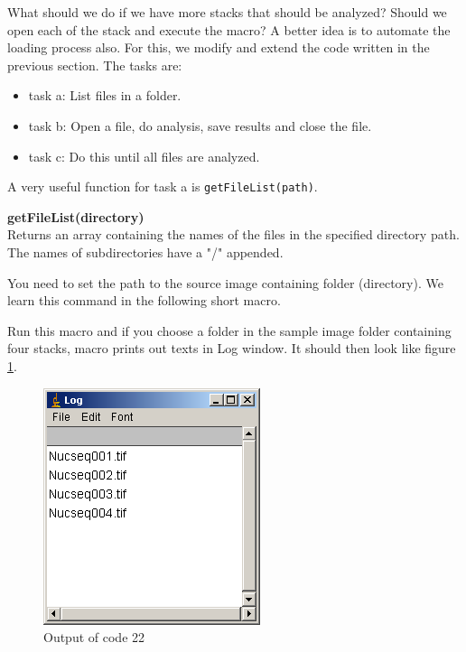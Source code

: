 \documentclass[11pt,a4paper,oneside]{report}
\newenvironment{indentCom}%
{\begin{list}{}%
         {\setlength{\leftmargin}{1em}}%
         \item[]%
}
{\end{list}}
\newcommand{\ilcom}[1]{\texttt{\small#1}}
\begin{document}
What should we do if we have more stacks that should be analyzed? Should we open each of the stack and execute the macro? A better idea is to automate the loading process also. For this, we modify and extend the code written in the previous section. The tasks are:

\begin{itemize}
\item task a: List files in a folder.
\item task b: Open a file, do analysis, save results and close the file. 
\item task c: Do this until all files are analyzed.
\end{itemize}
 
A very useful function for task a is \ilcom{getFileList(path)}.
\begin{indentCom}
\textbf{getFileList(directory)}\\
Returns an array containing the names of the files in the specified directory path. The names of subdirectories have a "/" appended.
\end{indentCom}
 
You need to set the path to the source image containing folder (directory). We learn this command in the following short macro. 



Run this macro and if you choose a folder in the sample image folder containing four stacks,  macro prints out texts in Log window. It should then look like figure \ref{fig:code22out}.
\begin{figure}[htbp]
\begin{center}
\includegraphics[scale=0.6]{fig/fig2521_FileBatchOUtput.png}
\caption{Output of code 22}
\label{fig:code22out}
\end{center}
\end{figure}
\end{document}
